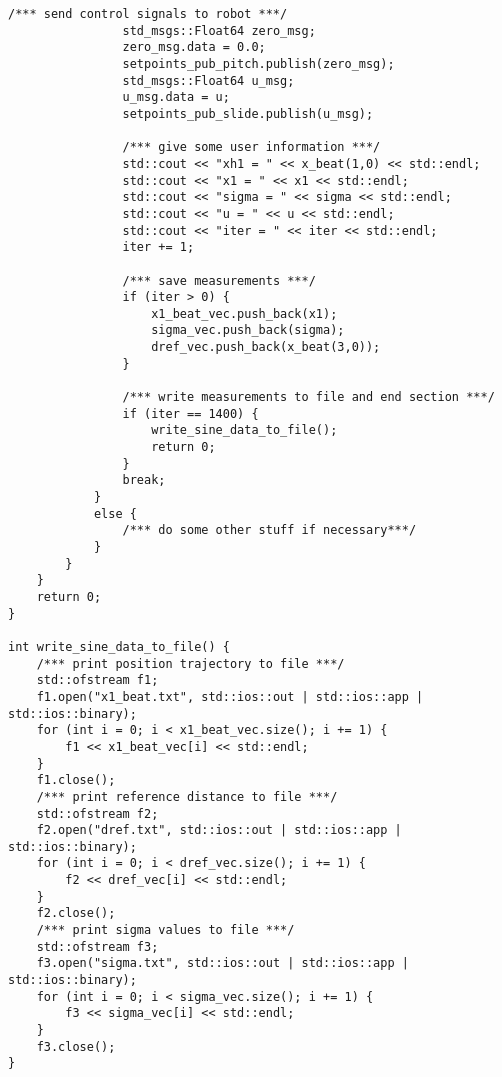 \begin{lstlisting}[language=gedit]
                /*** send control signals to robot ***/
		        std_msgs::Float64 zero_msg;
		        zero_msg.data = 0.0;
                setpoints_pub_pitch.publish(zero_msg);
		        std_msgs::Float64 u_msg;
		        u_msg.data = u;
                setpoints_pub_slide.publish(u_msg);

                /*** give some user information ***/
                std::cout << "xh1 = " << x_beat(1,0) << std::endl;
                std::cout << "x1 = " << x1 << std::endl;
                std::cout << "sigma = " << sigma << std::endl;
                std::cout << "u = " << u << std::endl;
                std::cout << "iter = " << iter << std::endl;               
                iter += 1;

                /*** save measurements ***/
                if (iter > 0) {
                    x1_beat_vec.push_back(x1);
                    sigma_vec.push_back(sigma);
                    dref_vec.push_back(x_beat(3,0));
                }

                /*** write measurements to file and end section ***/
                if (iter == 1400) {
                    write_sine_data_to_file();
                    return 0;
                }
                break;
            }
            else {
                /*** do some other stuff if necessary***/
            }
        }
    }
    return 0;
}

int write_sine_data_to_file() {
    /*** print position trajectory to file ***/
    std::ofstream f1;
    f1.open("x1_beat.txt", std::ios::out | std::ios::app | std::ios::binary);
    for (int i = 0; i < x1_beat_vec.size(); i += 1) {
        f1 << x1_beat_vec[i] << std::endl;
    }
    f1.close();
    /*** print reference distance to file ***/
    std::ofstream f2;
    f2.open("dref.txt", std::ios::out | std::ios::app | std::ios::binary);
    for (int i = 0; i < dref_vec.size(); i += 1) {
        f2 << dref_vec[i] << std::endl;
    }
    f2.close();
    /*** print sigma values to file ***/
    std::ofstream f3;
    f3.open("sigma.txt", std::ios::out | std::ios::app | std::ios::binary);
    for (int i = 0; i < sigma_vec.size(); i += 1) {
        f3 << sigma_vec[i] << std::endl;
    }
    f3.close();
}


\end{lstlisting}
